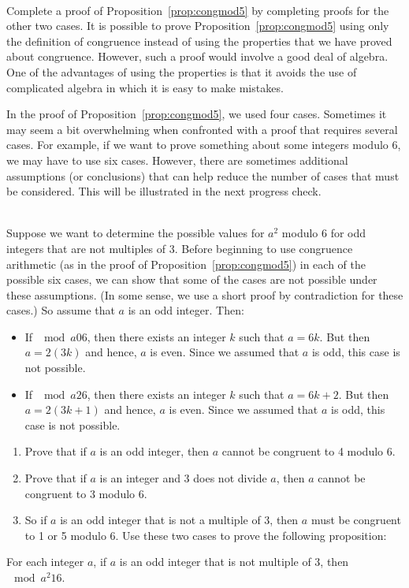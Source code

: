 \newpar
\begin{prog} \label{prog:propertiesofcong} \hfill \\
Complete a proof of Proposition~\ref{prop:congmod5} by completing proofs for the other two cases.  \note It is possible to prove Proposition~\ref{prop:congmod5} using only the definition of congruence instead of using the properties that we have proved about congruence.  However, such a proof would involve a good deal of algebra.  One of the advantages of using the properties is that it avoids the use of complicated algebra in which it is easy to make mistakes.
\end{prog}
\hbreak
In the proof of Proposition~\ref{prop:congmod5}, we used four cases.  Sometimes it may seem a bit overwhelming when confronted with a proof that requires several cases.  For example, if we want to prove something about some integers modulo 6, we may have to use six cases.  However, there are sometimes additional assumptions (or conclusions) that can help reduce the number of cases that must be considered.  This will be illustrated in the next progress check.

\begin{prog} \label{prog:casesmod6} \hfill \\ 
Suppose we want to determine the possible values for $a^2$ modulo 6 for odd integers that are not multiples of 3.  Before beginning to use congruence arithmetic (as in the proof of Proposition~\ref{prop:congmod5}) in each of the possible six cases, we can show that some of the cases are not possible under these assumptions.  (In some sense, we use a short proof by contradiction for these cases.)  So assume that $a$ is an odd integer.  Then:
\begin{itemize}
  \item If $\mod{a}{0}{6}$, then there exists an integer $k$ such that $a = 6k$.  But then $a = 2(3k)$ and hence, $a$ is even.  Since we assumed that $a$ is odd, this case is not possible.
  \item If $\mod{a}{2}{6}$, then there exists an integer $k$ such that $a = 6k + 2 $.  But then $a = 2(3k + 1)$ and hence, 
$a$ is even.  Since we assumed that $a$ is odd, this case is not possible.
\end{itemize}
\begin{enumerate}
  \item Prove that if $a$ is an odd integer, then $a$ cannot be congruent to 4 modulo 6.
  \item Prove that if $a$ is an integer and 3 does not divide $a$, then $a$ cannot be congruent to 3 modulo 6.
  \item So if $a$ is an odd integer that is not a multiple of 3, then $a$ must be congruent to 1 or 5 modulo 6.  Use these two cases to prove the following proposition: 
\end{enumerate}
\begin{proposition} \label{prop:congmod6}
For each integer $a$, if $a$ is an odd integer that is not multiple of 3, then $\mod{a^2}{1}{6}$.
\end{proposition}
\end{prog}
\hbreak

